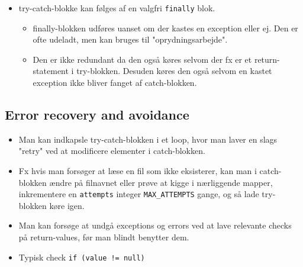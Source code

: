 \begin{itemize}
\begin{itemize}
  \end{itemize}
  \item try-catch-blokke kan følges af en valgfri \verb|finally| blok.
  \begin{itemize}
    \item finally-blokken udføres uanset om der kastes en exception eller ej. Den er ofte udeladt, men kan bruges til "oprydningsarbejde".
    \item Den er ikke redundant da den også køres selvom der fx er et return-statement i try-blokken. Desuden køres den også selvom en kastet exception ikke bliver fanget af catch-blokken.
  \end{itemize}
\end{itemize}

\subsection{Error recovery and avoidance}
\begin{itemize}
  \item Man kan indkapsle try-catch-blokken i et loop, hvor man laver en slags "retry" ved at modificere elementer i catch-blokken.
  \item Fx hvis man forsøger at læse en fil som ikke eksisterer, kan man i catch-blokken ændre på filnavnet eller prøve at kigge i nærliggende mapper, inkrementere en \verb|attempts| integer \verb|MAX_ATTEMPTS| gange, og så lade try-blokken køre igen.
  \item Man kan forsøge at undgå exceptions og errors ved at lave relevante checks på return-values, før man blindt benytter dem.
  \item Typisk check \verb|if (value != null)|
\end{itemize}

